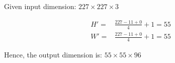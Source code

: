 \documentclass[a4paper,10pt]{article}
\begin{document}
Given input dimension: $227 \times 227 \times 3$

\begin{align}
H' =& \frac{227 - 11 + 0}{4} + 1 = 55 \\
W' =& \frac{227 - 11 + 0}{4} + 1 = 55
\end{align}

Hence, the output dimension is: $55 \times 55 \times 96$

\section{}


\section{}

\end{document}
